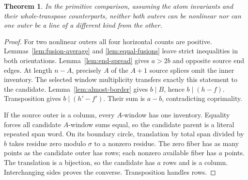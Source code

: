 \documentclass[11pt,a4paper]{amsart}
\numberwithin{equation}{section}
\theoremstyle{plain}
\newtheorem{theorem}{Theorem}[section]
\theoremstyle{definition}
\begin{document}
\begin{theorem}\label{thm:nonparallel-lcm}
In the primitive comparison, assuming the atom invariants and their whole-transpose counterparts, neither both outers can be nonlinear nor can one outer be a line of a different kind from the other.
\end{theorem}
\begin{proof}
For two nonlinear outers all four horizontal counts are positive.  Lemmas~\ref{lem:fusion-average} and \ref{lem:equal-fusions} leave strict inequalities in both orientations.  Lemma~\ref{lem:end-spread} gives \(a>2b\) and opposite source end edges.  At length \(n-A\), precisely \(A\) of the \(A+1\) source splices omit the inner inventory.  The selected window multiplicity transfers exactly this statement to the candidate.  Lemma~\ref{lem:almost-border} gives \(b\mid B\), hence \(b\mid(h-f)\).  Transposition gives \(b\mid(h'-f')\).  Their sum is \(a-b\), contradicting coprimality.

If the source outer is a column, every \(A\)-window has one inventory.  Equality forces all candidate \(A\)-window sums equal, so the candidate parent is a literal repeated span word.  On its boundary circle, translation by total span divided by \(b\) takes residue zero modulo \(\sigma\) to a nonzero residue.  The zero fiber has as many points as the candidate outer has rows; each nonzero available fiber has \(a\) points.  The translation is a bijection, so the candidate has \(a\) rows and is a column.  Interchanging sides proves the converse.  Transposition handles rows.
\end{proof}
\end{document}
